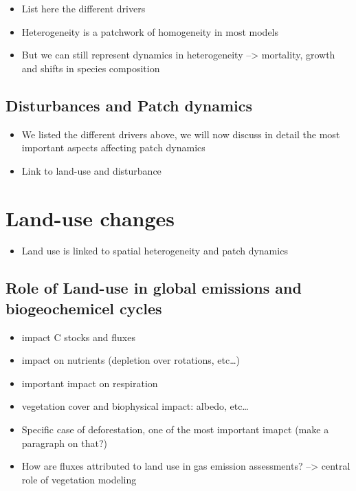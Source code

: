 \documentclass[
  oneside]{book}
\providecommand{\tightlist}{%
  \setlength{\itemsep}{0pt}\setlength{\parskip}{0pt}}
\begin{document}
\begin{itemize}
\tightlist
\item
  List here the different drivers
\item
  Heterogeneity is a patchwork of homogeneity in most models
\item
  But we can still represent dynamics in heterogeneity --\textgreater{} mortality, growth and shifts in species composition
\end{itemize}

\hypertarget{disturbances-and-patch-dynamics}{%
\subsection{Disturbances and Patch dynamics}\label{disturbances-and-patch-dynamics}}

\begin{itemize}
\tightlist
\item
  We listed the different drivers above, we will now discuss in detail the most important aspects affecting patch dynamics
\item
  Link to land-use and disturbance
\end{itemize}

\hypertarget{land-use-changes}{%
\section{Land-use changes}\label{land-use-changes}}

\begin{itemize}
\tightlist
\item
  Land use is linked to spatial heterogeneity and patch dynamics
\end{itemize}

\hypertarget{role-of-land-use-in-global-emissions-and-biogeochemicel-cycles}{%
\subsection{Role of Land-use in global emissions and biogeochemicel cycles}\label{role-of-land-use-in-global-emissions-and-biogeochemicel-cycles}}

\begin{itemize}
\tightlist
\item
  impact C stocks and fluxes
\item
  impact on nutrients (depletion over rotations, etc\ldots)
\item
  important impact on respiration
\item
  vegetation cover and biophysical impact: albedo, etc\ldots{}
\item
  Specific case of deforestation, one of the most important imapct (make a paragraph on that?)
\item
  How are fluxes attributed to land use in gas emission assessments? --\textgreater{} central role of vegetation modeling
\end{itemize}
\end{document}
